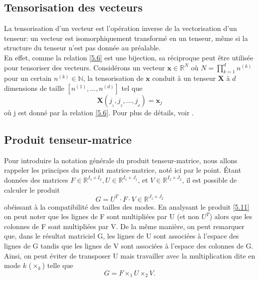 \documentclass[11pt,a4paper,oneside]{book}
\def\N{\mathbb N}
\def\R{\mathbb R}
\newcommand{\mbf}[1]{\mathbf{#1}}
\begin{document}
\subsection{Tensorisation des vecteurs}\label{tensoriser}
La tensorisation d'un vecteur est l'opération inverse de la vectorisation d'un tenseur: un vecteur est isomorphiquement transformé en un tenseur, même si la structure du tenseur n'est pas donnée au préalable.\\
 En effet, comme la relation \eqref{5.6} est une bijection, sa réciproque peut être utilisée pour tensoriser des vecteurs. Considérons un vecteur $ \mbf{x}\in\R^{N} $ où $N = \prod_{k =1}^d n^{(k)}$ pour un certain $n^{(k)} \in \N$, la tensorisation de $ \mbf{x} $ conduit à un tenseur $ \mbf{X} $ à $ d $ dimensions de taille $[n^{(1)},\ldots,n^{(d)}]$ tel que
$$\mathbf{X}(j_{_1},j_{_2},\ldots,j_{_d}) = \mathbf{x}_j$$ 
où j est donné par la relation \eqref{5.6}. Pour plus de détails, voir \cite[pp.170-172 et pp.10-12]{hackbusch2012tensor}.

\subsection{Produit tenseur-matrice}
Pour introduire la notation générale du produit tenseur-matrice, nous allons rappeler les principes du produit matrice-matrice, noté ici par le point. Étant données des matrices $F \in \R^{I_1 \times I_2}, U \in \R^{I_1 \times J_1} $, et $V \in \R^{I_2 \times J_2}$, il est possible de calculer le produit
\begin{equation}
\label{5.11}
G = U^T\cdot F\cdot V  \in \R^{J_{1} \times J_{2}}
\end{equation}
obéissant à la compatibilité des tailles des modes. En analysant le produit \eqref{5.11} on peut noter que les lignes de F sont multipliées par U (et non $ U^{T} $) alors que les colonnes de F sont multipliées par V. De la même manière, on peut remarquer que, dans le résultat matriciel G, les lignes de U sont associées à l'espace des lignes de G tandis que les lignes de V sont associées à l'espace des colonnes de G. Ainsi, on peut éviter de transposer U mais travailler avec la multiplication dite en mode $ k $ ($ \times_{k} $) telle que
\begin{equation}\label{modekProd1}
G = F \times_{1} U\times_{2} V.
\end{equation}
\end{document}
